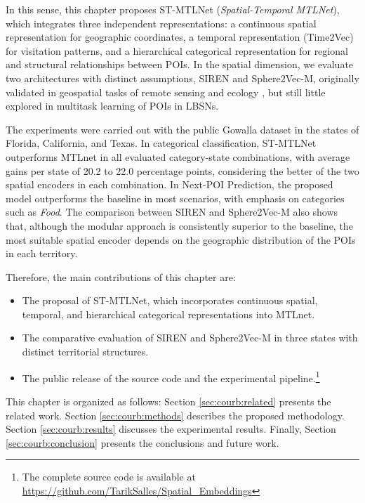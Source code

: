 In this sense, this chapter proposes ST-MTLNet (\textit{Spatial-Temporal MTLNet}), which integrates three independent representations: a continuous spatial representation for geographic coordinates, a temporal representation (Time2Vec) for visitation patterns, and a hierarchical categorical representation for regional and structural relationships between POIs. In the spatial dimension, we evaluate two architectures with distinct assumptions, SIREN and Sphere2Vec-M, originally validated in geospatial tasks of remote sensing and ecology \cite{wu2024torchspatial}, but still little explored in multitask learning of POIs in LBSNs.

The experiments were carried out with the public Gowalla dataset \cite{jure2014snap} in the states of Florida, California, and Texas. In categorical classification, ST-MTLNet outperforms MTLnet in all evaluated category-state combinations, with average gains per state of 20.2 to 22.0 percentage points, considering the better of the two spatial encoders in each combination. In Next-POI Prediction, the proposed model outperforms the baseline in most scenarios, with emphasis on categories such as \textit{Food}. The comparison between SIREN and Sphere2Vec-M also shows that, although the modular approach is consistently superior to the baseline, the most suitable spatial encoder depends on the geographic distribution of the POIs in each territory.

Therefore, the main contributions of this chapter are:
\begin{itemize}
\item The proposal of ST-MTLNet, which incorporates continuous spatial, temporal, and hierarchical categorical representations into MTLnet.

\item The comparative evaluation of SIREN and Sphere2Vec-M in three states with distinct territorial structures.

\item The public release of the source code and the experimental pipeline.\footnote{The complete source code is available at \url{https://github.com/TarikSalles/Spatial_Embeddings}}
\end{itemize}

This chapter is organized as follows: Section \ref{sec:courb:related} presents the related work. Section \ref{sec:courb:methods} describes the proposed methodology. Section \ref{sec:courb:results} discusses the experimental results. Finally, Section \ref{sec:courb:conclusion} presents the conclusions and future work.
